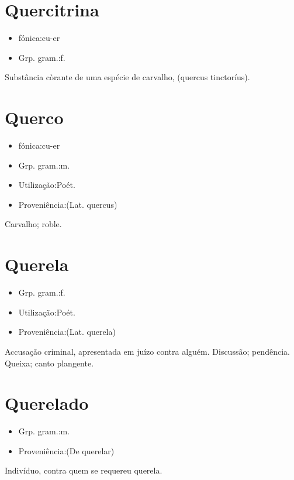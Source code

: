 \section{Quercitrina}
\begin{itemize}
\item {fónica:cu-er}
\end{itemize}
\begin{itemize}
\item {Grp. gram.:f.}
\end{itemize}
Substância còrante de uma espécie de carvalho, (\textunderscore quercus tinctoríus\textunderscore ).
\section{Querco}
\begin{itemize}
\item {fónica:cu-er}
\end{itemize}
\begin{itemize}
\item {Grp. gram.:m.}
\end{itemize}
\begin{itemize}
\item {Utilização:Poét.}
\end{itemize}
\begin{itemize}
\item {Proveniência:(Lat. \textunderscore quercus\textunderscore )}
\end{itemize}
Carvalho; roble.
\section{Querela}
\begin{itemize}
\item {Grp. gram.:f.}
\end{itemize}
\begin{itemize}
\item {Utilização:Poét.}
\end{itemize}
\begin{itemize}
\item {Proveniência:(Lat. \textunderscore querela\textunderscore )}
\end{itemize}
Accusação criminal, apresentada em juízo contra alguém.
Discussão; pendência.
Queixa; canto plangente.
\section{Querelado}
\begin{itemize}
\item {Grp. gram.:m.}
\end{itemize}
\begin{itemize}
\item {Proveniência:(De \textunderscore querelar\textunderscore )}
\end{itemize}
Indivíduo, contra quem se requereu querela.

